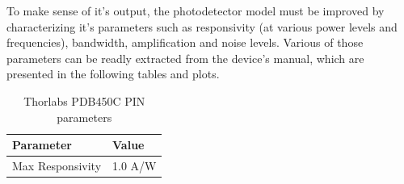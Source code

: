 To make sense of it's output, the photodetector model must be improved by characterizing it's parameters such as responsivity (at various power levels and frequencies), bandwidth, amplification and noise levels.
%
Various of those parameters can be readly extracted from the device's manual, which are presented in the following tables and plots.\\
%
%
%
%
\begin{table}[H]
	\centering
	\begin{tabulary}{1.0\textwidth}{|L|L|}
		\hline
		\textbf{Parameter}		& \textbf{Value}\\
		\hline
		Max Responsivity		& 1.0 A/W\\
		\hline
	\end{tabulary}
	\caption{Thorlabs PDB450C PIN parameters}
	\label{table:thorlabs}
\end{table}

